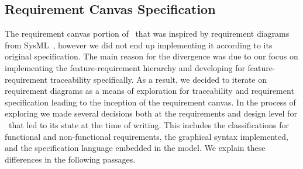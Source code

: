 %



\subsection{Requirement Canvas Specification}

The requirement canvas portion of \tool\ that was inspired by requirement diagrams from SysML~\cite{sysml2019omg}, however we did not end up implementing it according to its original specification. The main reason for the divergence was due to our focus on implementing the feature-requirement hierarchy and developing for feature-requirement traceability specifically. As a result, we decided to iterate on requirement diagrams as a means of exploration for traceability and requirement specification leading to the inception of the requirement canvas. In the process of exploring we made several decisions both at the requirements and design level for \tool\ that led to its state at the time of writing. This includes the classifications for functional and non-functional requirements, the graphical syntax implemented, and the specification language embedded in the model. We explain these differences in the following passages.

